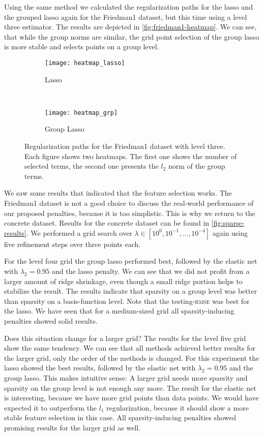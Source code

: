 Using the same method we calculated the regularization paths for the lasso and
the grouped lasso again for the Friedman1 dataset, but this time using a level
three estimator.
The results are depicted in \vref{fig:friedman1-heatmap}.
We can see, that while the group norms are similar, the grid point selection of
the group lasso is more stable and selects points on a group level.

\begin{figure}[p]
  \begin{subfigure}[t]{0.5\textwidth}
    \centering
    \texttt{[image: heatmap\_lasso]}
    \caption{Lasso}
  \end{subfigure}~
  \begin{subfigure}[t]{0.5\textwidth}
    \centering
    \texttt{[image: heatmap\_grp]}
    \caption{Group Lasso}
  \end{subfigure}
  \caption{Regularization paths for the Friedman1 dataset with level three.
  Each figure shows two heatmaps.
  The first one shows the number of selected terms, the second one presents the \(l_2\) norm of the
  group terms.}\label{fig:friedman1-heatmap}
\end{figure}

We saw some results that indicated that the feature selection works.
The Friedman1 dataset is not a good choice to discuss the real-world performance
of our proposed penalties, because it is too simplistic.
This is why we return to the concrete dataset.
Results for the concrete dataset can be found in \cref{fig:sparse-results}.
We performed a grid search over \(\lambda \in [10^{0}, 10^{-1}, \ldots,
10^{-4}]\) again using five refinement steps over three points each.

For the level four grid the group lasso performed best, followed by the elastic
net with \(\lambda_2 = 0.95\) and the lasso penalty.
We can see that we did not profit from a larger amount of ridge shrinkage, even
though a small ridge portion helps to stabilize the result.
The results indicate that sparsity on a group level was better than sparsity on a
basis-function level.
Note that the testing-\textsc{rmse} was best for the lasso.
We have seen that for a medium-sized grid all sparsity-inducing penalties showed
solid results.

Does this situation change for a larger grid?
The results for the level five grid show the same tendency.
We can see that all methods achieved better results for the larger grid, only
the order of the methods is changed.
For this experiment the lasso showed the best results, followed by the elastic net with
\(\lambda_2 = 0.95\) and the group lasso.
This makes intuitive sense:
A larger grid needs more sparsity and sparsity on the group level is not enough
any more.
The result for the elastic net is interesting, because we have more grid points
than data points.
We would have expected it to outperform the \(l_1\) regularization, because it
should show a more stable feature selection in this case.
All sparsity-inducing penalties showed promising results for the larger grid as well.

